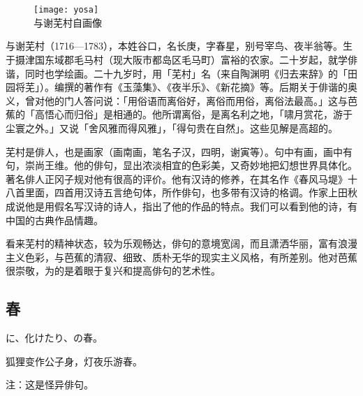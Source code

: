 \chapter[{\FM 与謝蕪村}]{\FM {}}

\begin{center}
    \begin{figure}
        \centering
        \texttt{[image: yosa]}\\[1em]
        \large{\FS 与谢芜村自画像}
    \end{figure}
\end{center}

\newpage

{\FS
    与谢芜村（1716—1783），本姓谷口，名长庚，字春星，别号宰鸟、夜半翁等。生于摄津国东域郡毛马村（现大阪市都岛区毛马町）富裕的农家。二十岁起，就学俳谐，同时也学绘画。二十九岁时，用「芜村」名（来自陶渊明《归去来辞》的「田园将芜」）。编撰的著作有《玉藻集》、《夜半乐》、《新花摘》等。后期关于俳谐的奥义，曾对他的门人答问说：「用俗语而离俗好，离俗而用俗，离俗法最高。」这与芭蕉的「高悟心而归俗」是相通的。他所谓离俗，是离名利之地，「啸月赏花，游于尘寰之外。」又说「舍风雅而得风雅」，「得句贵在自然」。这些见解是高超的。

    芜村是俳人，也是画家（画南画，笔名子汉，四明，谢寅等）。句中有画，画中有句，崇尚王维。他的俳句，显出浓淡相宜的色彩美，又奇妙地把幻想世界具体化。著名俳人正冈子规对他有很高的评价。他有汉诗的修养，在其名作《春风马堤》\footnotemark[1]十八首里面，四首用汉诗五言绝句体，所作俳句，也多带有汉诗的格调。作家上田秋成说他是用假名写汉诗的诗人，指出了他的作品的特点。我们可以看到他的诗，有中国的古典作品情趣。

    看来芜村的精神状态，较为乐观畅达，俳句的意境宽阔，而且潇洒华丽，富有浪漫主义色彩，与芭蕉的清寂、细致、质朴无华的现实主义风格，有所差别。他对芭蕉很崇敬，为的是着眼于复兴和提高俳句的艺术性。
}

\newpage

\section{\FK 春}

\setcounter{haikucounter}{0}

\begin{haiku}
    {\FH {}に、化けたり、の春。}

    {\FK 狐狸变作公子身，灯夜乐游春。}

    {\FT 注：这是怪异俳句。}
\end{haiku}

